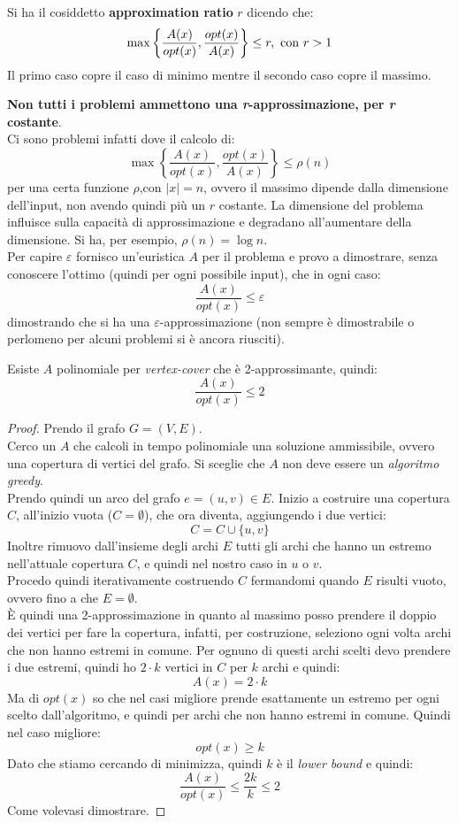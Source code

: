 \documentclass[a4paper,12pt, oneside]{book}
\begin{document}
\begin{definizione}
  Si ha il cosiddetto \textbf{approximation ratio} $r$ dicendo che:
  \[\max\left\{\frac{A(x)}{opt(x)},\frac{opt(x)}{A(x)}\right\}\leq r,\mbox{
      \textnormal{con} }r>1\] 
  Il primo caso copre il caso di minimo mentre il secondo caso copre il massimo.
\end{definizione}
\textbf{Non tutti i problemi ammettono una \textit{r}-approssimazione, per
  \textit{r} costante}.\\
Ci sono problemi infatti dove il calcolo di:
\[\max\left\{\frac{A(x)}{opt(x)},\frac{opt(x)}{A(x)}\right\}\leq \rho(n)\]
per una certa funzione $\rho$,con $|x|=n$,
ovvero il massimo dipende dalla
dimensione dell'input, non avendo quindi più un $r$ costante. La dimensione del
problema influisce sulla capacità di approssimazione e degradano all'aumentare
della dimensione. Si ha, per esempio, $\rho(n)=\log n$.\\
Per capire $\varepsilon$ fornisco un'euristica $A$ per il problema e provo a
dimostrare, senza conoscere l'ottimo (quindi per ogni possibile input), che in
ogni caso:
\[\frac{A(x)}{opt(x)}\leq \varepsilon\]
dimostrando che si ha una $\varepsilon$-approssimazione (non sempre è
dimostrabile o perlomeno per alcuni problemi si è ancora riusciti).
\begin{teorema}
  Esiste $A$ polinomiale per \textit{vertex-cover} che è 2-approssimante,
  quindi:
  \[\frac{A(x)}{opt(x)}\leq 2\]
\end{teorema}
\begin{proof}
  Prendo il grafo $G=(V,E)$.\\
  Cerco un $A$ che calcoli in tempo polinomiale una soluzione ammissibile,
  ovvero una copertura di vertici del grafo. Si sceglie che $A$ non deve essere
  un \textit{algoritmo greedy}.\\
  Prendo quindi un arco del grafo $e=(u,v)\in E$. Inizio a costruire una
  copertura $C$, all'inizio vuota ($C=\emptyset$), che ora diventa, aggiungendo
  i due vertici:
  \[C=C\cup\{u,v\}\]
  Inoltre rimuovo dall'insieme degli archi $E$ tutti gli archi che hanno un
  estremo nell'attuale copertura $C$, e quindi nel nostro caso in $u$ o $v$.\\
  Procedo quindi iterativamente costruendo $C$ fermandomi quando $E$ risulti
  vuoto, ovvero fino a che $E=\emptyset$.\\
  È quindi una 2-approssimazione in quanto al massimo posso prendere il doppio
  dei vertici per fare la copertura, infatti, per costruzione, seleziono ogni
  volta archi che non hanno estremi in comune. Per ognuno di questi archi scelti
  devo prendere i due estremi, quindi ho $2\cdot k$ vertici in $C$ per $k$ archi
  e quindi:
  \[A(x)=2\cdot k\]
  Ma di $opt(x)$ so che nel casi migliore prende esattamente un estremo per ogni
  scelto dall'algoritmo, e quindi per archi che non hanno estremi in
  comune. Quindi nel caso migliore:
  \[opt(x)\geq k\]
  Dato che stiamo cercando di minimizza, quindi $k$ è il \textit{lower bound} e
  quindi:
  \[\frac{A(x)}{opt(x)}\leq\frac{2k}{k}\leq 2\]
  Come volevasi dimostrare.
\end{proof}
\end{document}
